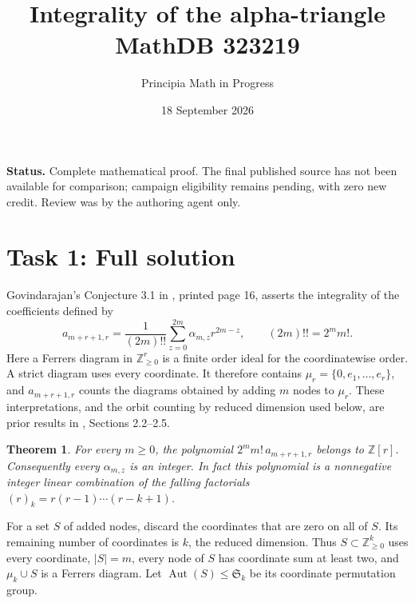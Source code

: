 \documentclass[11pt]{article}
\title{Integrality of the alpha-triangle\\\large MathDB 323219}
\author{Principia Math in Progress}
\date{18 September 2026}
\newtheorem{theorem}{Theorem}
\newcommand{\Aut}{\operatorname{Aut}}
\begin{document}
\maketitle
\noindent\textbf{Status.} Complete mathematical proof. The final published source has
not been available for comparison; campaign eligibility remains pending, with zero
new credit. Review was by the authoring agent only.

\section*{Task 1: Full solution}
Govindarajan's Conjecture 3.1 in \cite{G}, printed page 16, asserts the integrality
of the coefficients defined by
\[
 a_{m+r+1,r}=\frac1{(2m)!!}\sum_{z=0}^{2m}\alpha_{m,z}r^{2m-z},
 \qquad (2m)!!=2^m m!.
\]
Here a Ferrers diagram in $\mathbb Z_{\geq0}^r$ is a finite order ideal for the
coordinatewise order. A strict diagram uses every coordinate. It therefore
contains $\mu_r=\{0,e_1,\ldots,e_r\}$, and $a_{m+r+1,r}$ counts the diagrams
obtained by adding $m$ nodes to $\mu_r$. These interpretations, and the orbit
counting by reduced dimension used below, are prior results in \cite{G},
Sections 2.2--2.5.

\begin{theorem}\label{main}
For every $m\geq0$, the polynomial $2^m m!\,a_{m+r+1,r}$ belongs to $\mathbb Z[r]$.
Consequently every $\alpha_{m,z}$ is an integer. In fact this polynomial is a
nonnegative integer linear combination of the falling factorials
$(r)_k=r(r-1)\cdots(r-k+1)$.
\end{theorem}

For a set $S$ of added nodes, discard the coordinates that are zero on all of
$S$. Its remaining number of coordinates is $k$, the reduced dimension.
Thus $S\subset\mathbb Z_{\geq0}^k$ uses every coordinate, $|S|=m$, every
node of $S$ has coordinate sum at least two, and $\mu_k\cup S$ is a Ferrers
diagram. Let $\Aut(S)\leq\mathfrak S_k$ be its coordinate permutation group.
\end{document}
